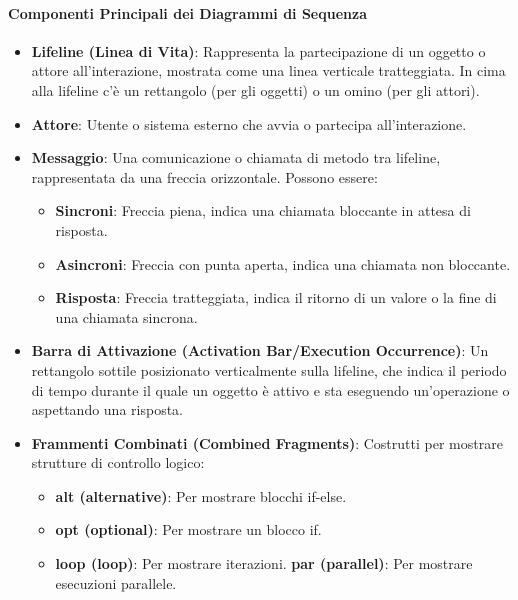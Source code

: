 \paragraph{Componenti Principali dei Diagrammi di Sequenza}
\begin{itemize}
    \item \textbf{Lifeline (Linea di Vita)}: Rappresenta la partecipazione di un oggetto o attore all'interazione, mostrata come una linea verticale tratteggiata. In cima alla lifeline c'è un rettangolo (per gli oggetti) o un omino (per gli attori).
    \item \textbf{Attore}: Utente o sistema esterno che avvia o partecipa all'interazione.
    \item \textbf{Messaggio}: Una comunicazione o chiamata di metodo tra lifeline, rappresentata da una freccia orizzontale. Possono essere:
    \begin{itemize}
        \item \textbf{Sincroni}: Freccia piena, indica una chiamata bloccante in attesa di risposta.
        \item \textbf{Asincroni}: Freccia con punta aperta, indica una chiamata non bloccante.
        \item \textbf{Risposta}: Freccia tratteggiata, indica il ritorno di un valore o la fine di una chiamata sincrona.
    \end{itemize}
    \item \textbf{Barra di Attivazione (Activation Bar/Execution Occurrence)}: Un rettangolo sottile posizionato verticalmente sulla lifeline, che indica il periodo di tempo durante il quale un oggetto è attivo e sta eseguendo un'operazione o aspettando una risposta.
    \item \textbf{Frammenti Combinati (Combined Fragments)}: Costrutti per mostrare strutture di controllo logico:
    \begin{itemize}
        \item \textbf{alt (alternative)}: Per mostrare blocchi if-else.
        \item \textbf{opt (optional)}: Per mostrare un blocco if.
        \item \textbf{loop (loop)}: Per mostrare iterazioni.
        \textbf{par (parallel)}: Per mostrare esecuzioni parallele.
    \end{itemize}
\end{itemize}

